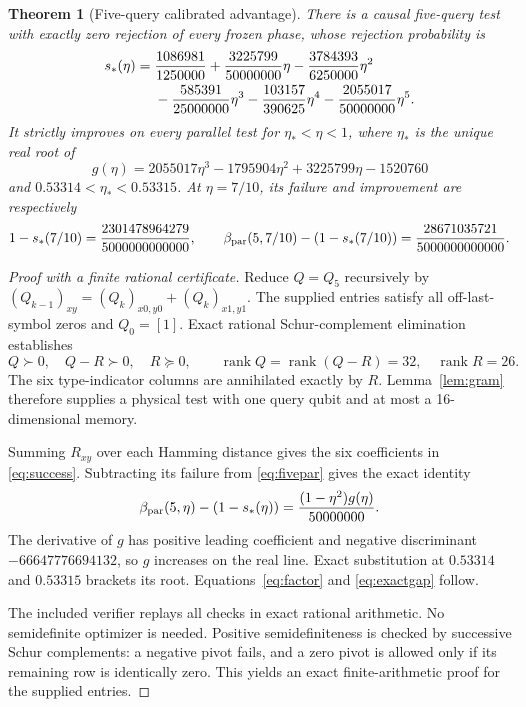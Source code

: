 \documentclass[11pt,a4paper]{article}
\newtheorem{theorem}{Theorem}[section]
\theoremstyle{remark}
\DeclareMathOperator{\rank}{rank}
\begin{document}
\begin{theorem}[Five-query calibrated advantage]\label{thm:separation}
There is a causal five-query test with exactly zero rejection of every
frozen phase, whose rejection probability is
\begin{align}
 s_*(\eta)={}&\frac{1086981}{1250000}
 +\frac{3225799}{50000000}\eta
 -\frac{3784393}{6250000}\eta^2 \notag\\
 &-\frac{585391}{25000000}\eta^3
 -\frac{103157}{390625}\eta^4
 -\frac{2055017}{50000000}\eta^5.\label{eq:success}
\end{align}
It strictly improves on every parallel test for
\(\eta_*<\eta<1\), where \(\eta_*\) is the unique real root of
\[
 g(\eta)=2055017\eta^3-1795904\eta^2+3225799\eta-1520760
\]
and \(0.53314<\eta_*<0.53315\).
At \(\eta=7/10\), its failure and improvement are respectively
\begin{equation}\label{eq:exactgap}
 1-s_*(7/10)=\frac{2301478964279}{5000000000000},\qquad
 \beta_{\rm par}(5,7/10)-(1-s_*(7/10))
 =\frac{28671035721}{5000000000000}.
\end{equation}
\end{theorem}
\begin{proof}[Proof with a finite rational certificate]
Reduce \(Q=Q_5\) recursively by
\((Q_{k-1})_{xy}=(Q_k)_{x0,y0}+(Q_k)_{x1,y1}\).
The supplied entries satisfy all off-last-symbol zeros and \(Q_0=[1]\).
Exact rational Schur-complement elimination establishes
\[
 Q\succ0,\quad Q-R\succ0,\quad R\succeq0,\qquad
 \rank Q=\rank(Q-R)=32,\quad\rank R=26.
\]
The six type-indicator columns are annihilated exactly by \(R\).
Lemma~\ref{lem:gram} therefore supplies a physical test with one query
qubit and at most a 16-dimensional memory.

Summing \(R_{xy}\) over each Hamming distance gives the six coefficients
in \eqref{eq:success}. Subtracting its failure from \eqref{eq:fivepar}
gives the exact identity
\begin{equation}\label{eq:factor}
 \beta_{\rm par}(5,\eta)-(1-s_*(\eta))
       =\frac{(1-\eta^2)g(\eta)}{50000000}.
\end{equation}
The derivative of \(g\) has positive leading coefficient and negative
discriminant \(-66647776694132\), so \(g\) increases on the real line.
Exact substitution at \(0.53314\) and \(0.53315\) brackets its root.
Equations~\eqref{eq:factor} and \eqref{eq:exactgap} follow.

The included verifier replays all checks in exact rational arithmetic.
No semidefinite optimizer is needed.
Positive semidefiniteness is checked by successive Schur complements:
a negative pivot fails, and a zero pivot is allowed only if its remaining
row is identically zero. This yields an exact finite-arithmetic proof
for the supplied entries.
\end{proof}
\end{document}
